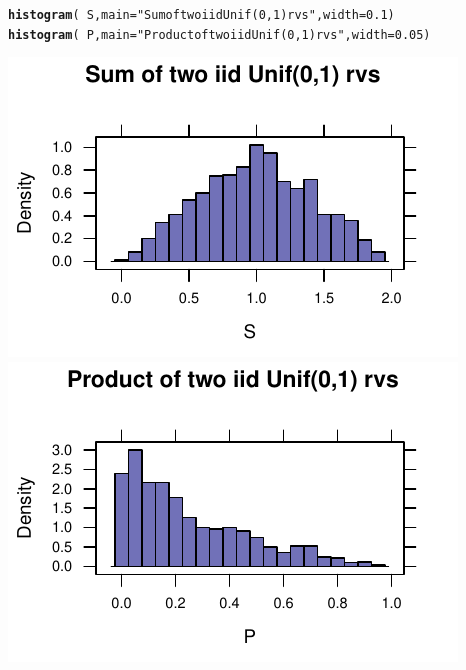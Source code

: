 \documentclass[twoside]{book}\usepackage[]{graphicx}\usepackage[]{xcolor}
\makeatletter
\def\maxwidth{ %
  \ifdim\Gin@nat@width>\linewidth
    \linewidth
  \else
    \Gin@nat@width
  \fi
}
\newcommand{\hlnum}[1]{\textcolor[rgb]{0.686,0.059,0.569}{#1}}%
\newcommand{\hlstr}[1]{\textcolor[rgb]{0.192,0.494,0.8}{#1}}%
\newcommand{\hlopt}[1]{\textcolor[rgb]{0,0,0}{#1}}%
\newcommand{\hlstd}[1]{\textcolor[rgb]{0.345,0.345,0.345}{#1}}%
\newcommand{\hlkwc}[1]{\textcolor[rgb]{0.333,0.667,0.333}{#1}}%
\newcommand{\hlkwd}[1]{\textcolor[rgb]{0.737,0.353,0.396}{\textbf{#1}}}%
\newenvironment{kframe}{%
 \def\at@end@of@kframe{}%
 \ifinner\ifhmode%
  \def\at@end@of@kframe{\end{minipage}}%
  \begin{minipage}{\columnwidth}%
 \fi\fi%
 \def\FrameCommand##1{\hskip\@totalleftmargin \hskip-\fboxsep
 \colorbox{shadecolor}{##1}\hskip-\fboxsep
     \hskip-\linewidth \hskip-\@totalleftmargin \hskip\columnwidth}%
 \MakeFramed {\advance\hsize-\width
   \@totalleftmargin\z@ \linewidth\hsize
   \@setminipage}}%
 {\par\unskip\endMakeFramed%
 \at@end@of@kframe}
\newenvironment{knitrout}{}{} %
\makeatother
\begin{document}
\begin{knitrout}
\color{fgcolor}\begin{kframe}
\begin{alltt}
\hlkwd{histogram}\hlstd{(}\hlopt{~}\hlstd{S,} \hlkwc{main} \hlstd{=} \hlstr{"Sum of two iid Unif(0,1) rvs"}\hlstd{,} \hlkwc{width} \hlstd{=} \hlnum{0.1}\hlstd{)}
\hlkwd{histogram}\hlstd{(}\hlopt{~}\hlstd{P,} \hlkwc{main} \hlstd{=} \hlstr{"Product of two iid Unif(0,1) rvs"}\hlstd{,} \hlkwc{width} \hlstd{=} \hlnum{0.05}\hlstd{)}
\end{alltt}
\end{kframe}

{\centering \includegraphics[width=\maxwidth]{figures/fig-sum-product-uniform-iid-1} 
\includegraphics[width=\maxwidth]{figures/fig-sum-product-uniform-iid-2} 

}



\end{knitrout}
\end{document}
